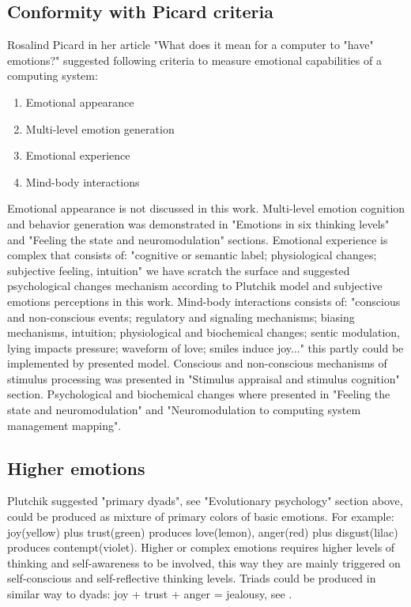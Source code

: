 \subsection{Conformity with Picard criteria}

Rosalind Picard in her article "What does it mean for a computer to "have" emotions?" \cite{whatdoesitmeanforcomputer} suggested following criteria to measure emotional capabilities of a computing system:

\begin{enumerate}
\item  Emotional appearance
\item  Multi-level emotion generation
\item  Emotional experience
\item  Mind-body interactions
\end{enumerate}

Emotional appearance is not discussed in this work. Multi-level emotion cognition and behavior generation was demonstrated in "Emotions in six thinking levels" and "Feeling the state and neuromodulation" sections. Emotional experience is complex that consists of: "cognitive or semantic label; physiological changes; subjective feeling, intuition" we have scratch the surface and suggested psychological changes mechanism according to Plutchik model and subjective emotions perceptions in this work. Mind-body interactions consists of: "conscious and non-conscious events; regulatory and signaling mechanisms; biasing mechanisms, intuition; physiological and biochemical changes; sentic modulation, lying impacts pressure; waveform of love; smiles induce joy..." this partly could be implemented by presented model. Conscious and non-conscious mechanisms of stimulus processing was presented in "Stimulus appraisal and stimulus cognition" section. Psychological and biochemical changes where presented in "Feeling the state and neuromodulation" and "Neuromodulation to computing system management mapping".

\subsection{Higher emotions}

Plutchik \cite{natureofemotions} suggested "primary dyads", see "Evolutionary psychology" section above, could be produced as mixture of primary colors of basic emotions. For example: joy(yellow) plus trust(green) produces love(lemon), anger(red) plus disgust(lilac) produces contempt(violet). Higher or complex emotions requires higher levels of thinking and self-awareness to be involved, this way they are mainly triggered on self-conscious and self-reflective thinking levels. Triads could be produced in similar way to dyads: joy + trust + anger = jealousy, see \cite{senticcomputing}.


